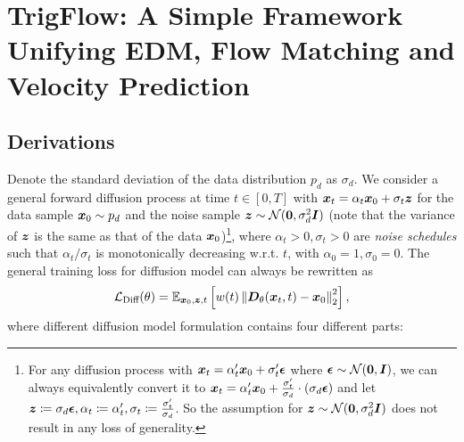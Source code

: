 \section{TrigFlow: A Simple Framework Unifying EDM, Flow Matching and Velocity Prediction}
\label{appendix:trigflow}

\subsection{Derivations}
\label{appendix:trigflow_derivation}

Denote the standard deviation of the data distribution $p_{d}$ as $\sigma_d$. We consider a general forward diffusion process at time $t\in[0, T]$ with ${\bm{x}}_t = \alpha_t {\bm{x}}_0 + \sigma_t {\bm{z}}$ for the data sample ${\bm{x}}_0\sim p_d$ and the noise sample ${\bm{z}} \sim {\mathcal{N}}({\bm{0}}, \sigma_d^2 {\bm{I}})$ (note that the variance of ${\bm{z}}$ is the same as that of the data ${\bm{x}}_0$)\footnote{For any diffusion process with ${\bm{x}}_t = \alpha'_t {\bm{x}}_0 + \sigma'_t \bm{\epsilon}$ where $\bm{\epsilon}\sim {\mathcal{N}}({\bm{0}}, {\bm{I}})$, we can always equivalently convert it to ${\bm{x}}_t = \alpha'_t {\bm{x}}_0 + \frac{\sigma'_t}{\sigma_d} \cdot (\sigma_d \bm{\epsilon})$ and let ${\bm{z}} \coloneqq \sigma_d \bm{\epsilon}, \alpha_t \coloneqq \alpha'_t,\sigma_t \coloneqq \frac{\sigma'_t}{\sigma_d}$. So the assumption for ${\bm{z}} \sim {\mathcal{N}}({\bm{0}}, \sigma_d^2 {\bm{I}})$ does not result in any loss of generality.}, where $\alpha_t>0,\sigma_t>0$ are \textit{noise schedules} such that $\alpha_t/\sigma_t$ is monotonically decreasing w.r.t. $t$, with $\alpha_0=1, \sigma_0=0$. The general training loss for diffusion model can always be rewritten as
\begin{equation}
    {\mathcal{L}}_{\text{Diff}}(\theta) = \mathbb{E}_{{\bm{x}}_0,{\bm{z}},t}\left[
        w(t) \left\| {\bm{D}}_\theta({\bm{x}}_t,t) - {\bm{x}}_0 \right\|_2^2
    \right],
\end{equation}
where different diffusion model formulation contains four different parts:
